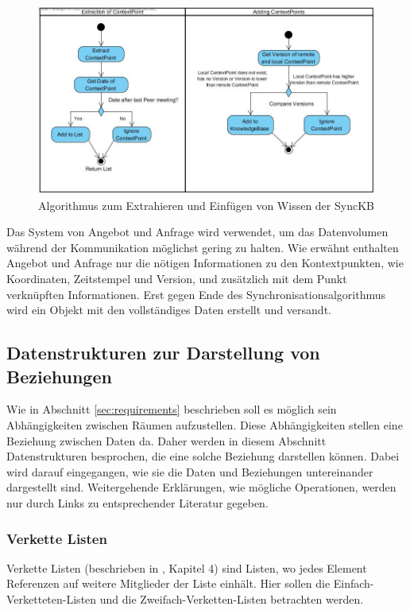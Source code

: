 \documentclass[a4paper]{article}
\begin{document}
	\begin{figure}[H] 
		\includegraphics[width=\linewidth]{../Bilder/sync_flow.jpg}
		\caption{Algorithmus zum Extrahieren und Einfügen von Wissen der SyncKB}
		\label{fig:SyncFlow}
	\end{figure}
	
	Das System von Angebot und Anfrage wird verwendet, um das Datenvolumen während
	der Kommunikation möglichst gering zu halten. Wie erwähnt enthalten Angebot
	und Anfrage nur die nötigen Informationen zu den Kontextpunkten, wie
	Koordinaten, Zeitstempel und Version, und zusätzlich mit dem Punkt verknüpften
	Informationen. Erst gegen Ende des Synchronisationsalgorithmus wird ein 
	Objekt mit den vollständiges Daten erstellt und versandt.
	
	\subsection{Datenstrukturen zur Darstellung von Beziehungen}
	\label{sec:datastruct}
	
	Wie in Abschnitt \ref{sec:requirements} beschrieben soll es möglich sein
	Abhängigkeiten zwischen Räumen aufzustellen. Diese Abhängigkeiten stellen
	eine Beziehung zwischen Daten da. Daher werden in diesem Abschnitt 
	Datenstrukturen besprochen, die eine solche Beziehung darstellen können.
	Dabei wird darauf eingegangen, wie sie die Daten und Beziehungen untereinander
	dargestellt sind. Weitergehende Erklärungen, wie mögliche Operationen, werden
	nur durch Links zu entsprechender Literatur gegeben.
	
	\subsubsection{Verkette Listen}
	
	Verkette Listen (beschrieben in \cite{FundData}, Kapitel 4) sind Listen,
	wo jedes Element Referenzen auf weitere Mitglieder der Liste einhält.
	Hier sollen die Einfach-Verketteten-Listen und die Zweifach-Verketten-Listen
	betrachten werden.
	
\end{document}

